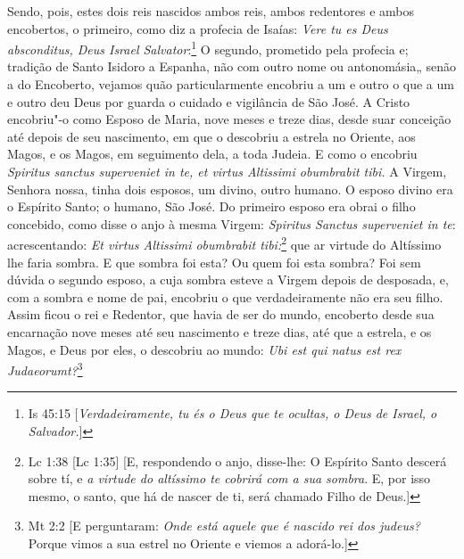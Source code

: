 Sendo, pois, estes dois reis nascidos ambos reis, ambos redentores e
ambos encobertos, o primeiro, como diz a profecia de Isaías: \emph{Vere
tu es Deus absconditus, Deus Israel Salvator}:\footnote{Is 45:15 [\textit{Verdadeiramente, tu és o Deus que te ocultas, o Deus de Israel, o Salvador.}]} O segundo,
prometido pela profecia e; tradição de Santo Isidoro a Espanha, não com
outro nome ou antonomásia„ senão a do Encoberto, vejamos quão
particularmente encobriu a um e outro o que a um e outro deu Deus por
guarda o cuidado e vigilância de São José. A Cristo encobriu"-o como
Esposo de Maria, nove meses e treze dias, desde suar conceição até
depois de seu nascimento, em que o descobriu a estrela no Oriente, aos
Magos, e os Magos, em seguimento dela, a toda Judeia. E como o encobriu
\emph{Spiritus sanctus superveniet in te, et virtus Altissimi obumbrabit
tibi.} A Virgem, Senhora nossa, tinha dois esposos, um divino,
outro humano. O esposo divino era o Espírito Santo; o humano, São José.
Do primeiro esposo era obrai o filho concebido, como disse o anjo à
mesma Virgem: \emph{Spiritus Sanctus superveniet in te}: acrescentando:
\emph{Et virtus Altissimi obumbrabit tibi:}\footnote{Lc 1:38 [Lc 1:35] [E, respondendo o anjo, disse-lhe: O Espírito Santo descerá sobre tí, e \textit{a virtude do altíssimo te cobrirá com a sua sombra}. E, por isso mesmo, o santo, que há de nascer de ti, será chamado Filho de Deus.]} que ar virtude do Altíssimo
lhe faria sombra. E que sombra foi esta? Ou quem foi esta sombra? Foi
sem dúvida o segundo esposo, a cuja sombra esteve a Virgem depois de
desposada, e, com a sombra e nome de pai, encobriu o que verdadeiramente
não era seu filho. Assim ficou o rei e Redentor, que havia de ser do
mundo, encoberto desde sua encarnação nove meses até seu nascimento e
treze dias, até que a estrela, e os Magos, e Deus por eles, o descobriu
ao mundo: \emph{Ubi est qui natus est rex Judaeorumt?}\footnote{Mt 2:2 [E perguntaram: \textit{Onde está aquele que é nascido rei dos judeus?} Porque vimos a sua estrel no Oriente e viemos a adorá-lo.]}

